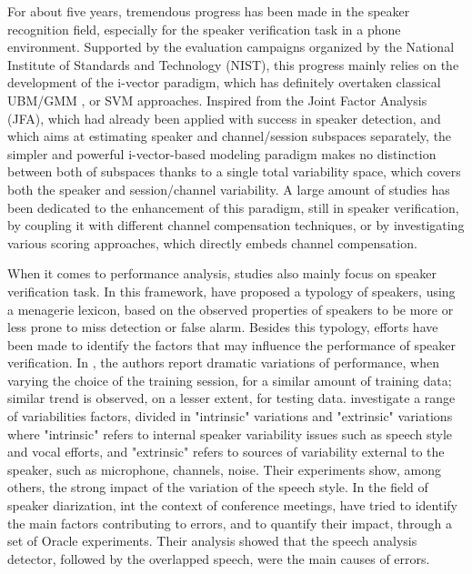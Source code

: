 For about five years, tremendous progress has been made in the speaker recognition field, especially for the speaker verification task in a phone environment. Supported by the evaluation campaigns organized by the National Institute of Standards and Technology (NIST)\cite{greenberg2013,greenberg2014}, this progress mainly relies on the development of the i-vector paradigm, which has definitely overtaken classical UBM/GMM \cite{bimbot2004}, or SVM \cite{wan2000} approaches. Inspired from the Joint Factor Analysis (JFA), which had already been applied with success in speaker detection, and which aims at estimating speaker and channel/session subspaces separately, the simpler and powerful i-vector-based modeling paradigm \cite{dehak2011} makes no distinction between both of subspaces thanks to a single total variability space, which covers both the speaker and session/channel variability. A large amount of studies has been dedicated to the enhancement of this paradigm, still in speaker verification, by coupling it with different channel compensation techniques\cite{dehak2011,bousquet2012,kanagasundaram2014}, or by investigating various scoring approaches, which directly embeds channel compensation\cite{kenny2010,dehak2011,garcia2011,jiang2012,bousquet2014}. 

When it comes to performance analysis, studies also mainly focus on speaker verification task.  In this framework, \cite{doddington98} have proposed a typology of speakers, using a menagerie lexicon, based on the observed properties of speakers to be more or less prone to miss detection or false alarm. Besides this typology, efforts have been made to identify the factors that may influence the performance of speaker verification. In \cite{kahn10}, the authors report dramatic variations of performance, when varying the choice of the training session, for a similar amount of training data; similar trend is observed, on a lesser extent, for testing data.  \cite{BESTanalysis} investigate a range of variabilities factors, divided in "intrinsic" variations and "extrinsic" variations where "intrinsic" refers to internal speaker variability issues such as speech style and vocal efforts, and "extrinsic" refers to sources of variability external to the speaker, such as microphone, channels, noise. Their experiments show, among others, the strong impact of the variation of the speech style.
In the field of speaker diarization, int the context of conference meetings, \cite{Huijbregts07theblame} have  tried to identify the main factors contributing to errors, and to quantify their impact, through a set of Oracle experiments. Their analysis showed that the speech analysis detector, followed by the overlapped speech, were the main causes of errors.

